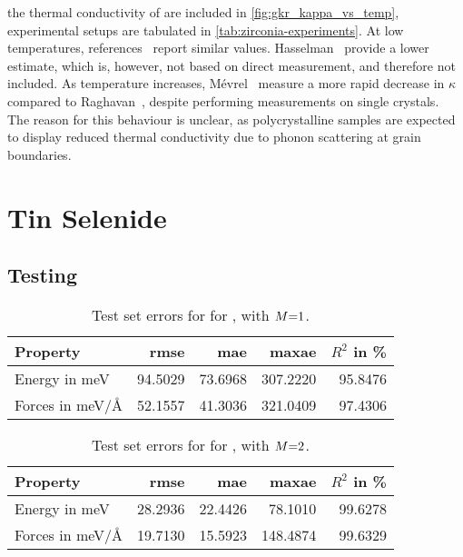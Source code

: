  the thermal conductivity of \zro{} are included in \cref{fig:gkr_kappa_vs_temp}, experimental setups are tabulated in \cref{tab:zirconia-experiments}. At low temperatures, references~\cite{rwpm1998t,bflm2000t,mlld2004t} report similar values. Hasselman~\etal{} provide a lower estimate, which is, however, not based on direct measurement, and therefore not included. As temperature increases, Mévrel~\etal{} measure a more rapid decrease in $\kappa$ compared to Raghavan~\etal{}, despite performing measurements on single crystals. The reason for this behaviour is unclear, as polycrystalline samples are expected to display reduced thermal conductivity due to phonon scattering at grain boundaries.

\clearpage

\section{Tin Selenide}
\label{sec:si-snse}

\subsection{Testing}

\begin{table}
\label{tab:si-snse_errors_m1}
\caption{Test set errors for \sok for , with $M{=}1$.}
\begin{tabular}{l | r r r r}
\toprule
Property & \acs{rmse} & \acs{mae} & \acs{maxae} & $R^2$ in \unit{\percent} \\
\midrule
Energy in \unit{meV}  & \num{94.5029} & \num{73.6968} & \num{307.2220}  & \num{95.8476} \\
Forces in \unit{meV/\angstrom} & \num{52.1557} & \num{41.3036} & \num{321.0409} & \num{97.4306} \\
\bottomrule
\end{tabular}
\end{table}

\begin{table}
\label{tab:si-snse_errors_m2}
\caption{Test set errors for \sok for , with $M{=}2$.}
\begin{tabular}{l | r r r r}
\toprule
Property & \acs{rmse} & \acs{mae} & \acs{maxae} & $R^2$ in \unit{\percent} \\
\midrule
Energy in \unit{meV} & \num{28.2936} & \num{22.4426} & \num{78.1010} & \num{99.6278} \\
Forces in \unit{meV/\angstrom} & \num{19.7130} & \num{15.5923} & \num{148.4874} & \num{99.6329} \\
\bottomrule
\end{tabular}
\end{table}

